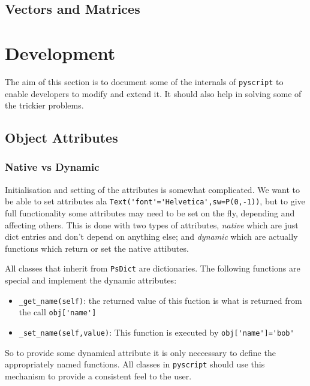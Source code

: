 \documentclass[a4paper]{book}
\begin{document}
\section{Vectors and Matrices}

\chapter{Development}

The aim of this section is to document some of the internals of
\Verb|pyscript| to enable developers to modify and extend it. 
It should also help in solving some of the trickier problems.


\section{Object Attributes}
\label{sec:attributes}


\subsection{Native vs Dynamic}
\label{sec:native-vs-dynamic}

Initialisation and setting of the attributes is somewhat complicated.  We
want to be able to set attributes ala
\Verb|Text('font'='Helvetica',sw=P(0,-1))|, but to give full functionality
some attributes may need to be set on the fly, depending and affecting
others.  This is done with two types of attributes, \emph{native} which are
just dict entries and don't depend on anything else; and \emph{dynamic}
which are actually functions which return or set the native attibutes.

All classes that inherit from \Verb|PsDict| are dictionaries. 
The following functions are special and implement the dynamic attributes:
\begin{itemize}
\item \Verb|_get_name(self)|: the returned value of this fuction is what is
  returned from the call \Verb|obj['name']|
\item \Verb|_set_name(self,value)|: This function is executed by
  \Verb|obj['name']='bob'|

\end{itemize}
So to provide some dynamical attribute it is only neccessary to define 
the appropriately named functions. All classes in \Verb|pyscript|
should use this mechanism to provide a consistent feel to the user.
\end{document}
